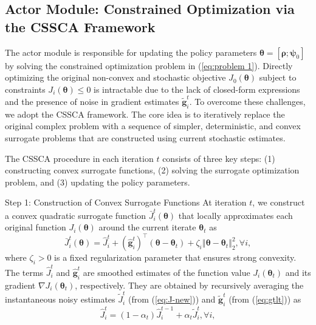 \documentclass{IEEEtran}
\begin{document}
\subsection{Actor Module: Constrained Optimization via the CSSCA Framework}
The actor module is responsible for updating the policy parameters $\boldsymbol{\theta}=[\boldsymbol{\rho};\boldsymbol{\psi}_{0}]$ by solving the constrained optimization problem in (\ref{eq:problem 1}). Directly optimizing the original non-convex and stochastic objective $J_{0}(\boldsymbol{\theta})$ subject to constraints $J_{i}(\boldsymbol{\theta})\leq0$ is intractable due to the lack of closed-form expressions and the presence of noise in gradient estimates $\tilde{\boldsymbol{g}}_{i}^{t}$. To overcome these challenges, we adopt the CSSCA framework. The core idea is to iteratively replace the original complex problem with a sequence of simpler, deterministic, and convex surrogate problems that are constructed using current stochastic estimates.

The CSSCA procedure in each iteration $t$ consists of three key steps: (1) constructing convex surrogate functions, (2) solving the surrogate optimization problem, and (3) updating the policy parameters.

Step 1: Construction of Convex Surrogate Functions At iteration $t$, we construct a convex quadratic surrogate function $\bar{J}_{i}^{t}(\boldsymbol{\theta})$ that locally approximates each original function $J_{i}(\boldsymbol{\theta})$ around the current iterate $\boldsymbol{\theta}_{t}$ as
\begin{equation}
\bar{J}_{i}^{t}\left(\boldsymbol{\theta}\right)=\hat{J}_{i}^{t}+\left(\hat{\boldsymbol{g}}_{i}^{t}\right)^{\intercal}\left(\boldsymbol{\theta}-\boldsymbol{\theta}_{t}\right)+\zeta_{i}\left\Vert \boldsymbol{\theta}-\boldsymbol{\theta}_{t}\right\Vert _{2}^{2},\forall i,\label{eq:surrogate functions}
\end{equation}
where $\zeta_{i}>0$ is a fixed regularization parameter that ensures strong convexity. The terms $\hat{J}_{i}^{t}$ and $\hat{\boldsymbol{g}}_{i}^{t}$ are smoothed estimates of the function value $J_{i}(\boldsymbol{\theta}_{t})$ and its gradient $\nabla J_{i}(\boldsymbol{\theta}_{t})$, respectively. They are obtained by recursively averaging the instantaneous noisy estimates $\tilde{J}_{i}^{t}$ (from (\ref{eq:J-new})) and $\tilde{\boldsymbol{g}}_{i}^{t}$ (from (\ref{eq:gtlt})) as
\begin{equation}
\hat{J}_{i}^{t}=\left(1-\alpha_{t}\right)\hat{J}_{i}^{t-1}+\alpha_{t}\tilde{J}_{i}^{t},\forall i,\label{eq:J-average}
\end{equation}
\end{document}
